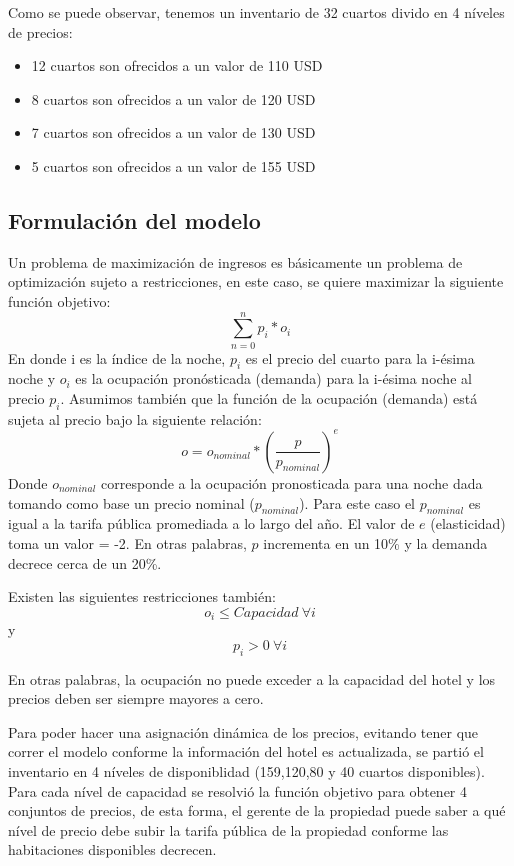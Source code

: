 Como se puede observar, tenemos un inventario de 32 cuartos divido en 4 níveles de precios:
\begin{itemize}[noitemsep]
\item 12 cuartos son ofrecidos a un valor de 110 USD
\item 8 cuartos son ofrecidos a un valor de 120 USD
\item 7 cuartos son ofrecidos a un valor de 130 USD
\item 5 cuartos son ofrecidos a un valor de 155 USD
\end{itemize}

\subsection*{Formulación del modelo}

Un problema de maximización de ingresos es básicamente un problema de optimización sujeto a restricciones, en este caso, se quiere maximizar la siguiente función objetivo:
$$\sum_{n=0}^{n}p_i*o_i$$
En donde i es la índice de la noche, $p_i$ es el precio del cuarto para la i-ésima noche y $o_i$ es la ocupación pronósticada (demanda) para la i-ésima noche al precio $p_i$. Asumimos también que la función de la ocupación (demanda) está sujeta al precio bajo la siguiente relación:
$$o = o_{nominal} * (\frac{p}{p_{nominal}})^e$$
Donde $o_{nominal}$ corresponde a la ocupación pronosticada para una noche dada tomando como base un precio nominal ($p_{nominal}$). Para este caso el $p_{nominal}$ es igual a la tarifa pública promediada a lo largo del año. El valor de $e$ (elasticidad) toma un valor = -2. En otras palabras, $p$ incrementa en un 10\% y la demanda decrece cerca de un 20\%.

Existen las siguientes restricciones también: $$o_i \leq Capacidad\ \forall i$$ y $$p_i > 0\ \forall i$$

En otras palabras, la ocupación no puede exceder a la capacidad del hotel y los precios deben ser siempre mayores a cero.

Para poder hacer una asignación dinámica de los precios, evitando tener que correr el modelo conforme la información del hotel es actualizada, se partió el inventario en 4 níveles de disponiblidad (159,120,80 y 40 cuartos disponibles). Para cada nível de capacidad se resolvió la función objetivo para obtener 4 conjuntos de precios, de esta forma, el gerente de la propiedad puede saber a qué nível de precio debe subir la tarifa pública de la propiedad conforme las habitaciones disponibles decrecen.

